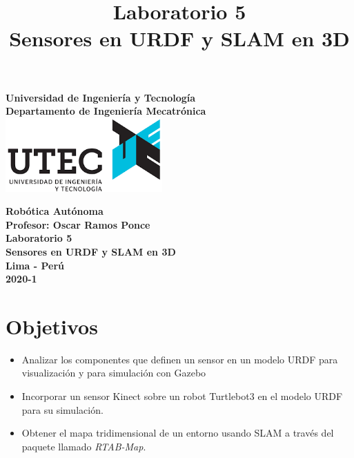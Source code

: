 \documentclass[a4paper,11pt]{robotlabs}
\title{
  \textbf{Laboratorio 5 \\ Sensores en URDF y SLAM en 3D}
  \date{}
}
\begin{document}

\thispagestyle{empty}
\begin{center}
\textbf{{\huge Universidad de Ingenier\'ia y Tecnolog\'ia}\\ [.5cm]
 {\LARGE Departamento de Ingenier\'ia  Mecatr\'onica}\\[3cm]
}
{\includegraphics[width=6cm]{images/utec}}\\[3cm]
\end{center}

\begin{center}
  {\LARGE \textbf{Robótica Autónoma}}\\[0.8cm]
  {\Large \textbf{Profesor: Oscar Ramos Ponce}}\\[3.0cm]
  {\Large \textbf{Laboratorio 5}}\\[0.5cm]
  {\Large \textbf{Sensores en URDF y SLAM en 3D}}\\[4.8cm] %
  {\Large \textbf{Lima - Perú}} \\[0.5cm]
  {\LARGE \textbf{2020-1}}
\end{center}

\newpage
\maketitle
\thispagestyle{fancyplain}


\section{Objetivos}

\begin{itemize}
\item Analizar los componentes que definen un sensor en un modelo URDF para
  visualización y para simulación con Gazebo
\item Incorporar un sensor Kinect sobre un robot Turtlebot3 en el modelo URDF
  para su simulación.
\item Obtener el mapa tridimensional de un entorno usando SLAM a través del
  paquete llamado \textit{RTAB-Map}.
\end{itemize}
\end{document}
